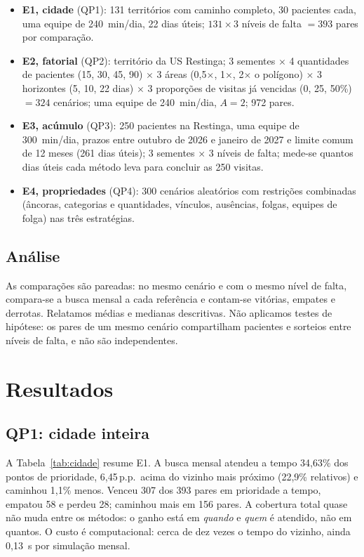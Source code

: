 \documentclass[conference,a4paper]{IEEEtran}
\newcommand{\pp}{\,p.p.}
\begin{document}
\begin{itemize}
  \item \textbf{E1, cidade} (QP1): 131 territórios com caminho completo, 30 pacientes cada, uma equipe de 240~min/dia, 22 dias úteis; $131 \times 3$ níveis de falta $= 393$ pares por comparação.
  \item \textbf{E2, fatorial} (QP2): território da US Restinga; 3 sementes $\times$ 4 quantidades de pacientes (15, 30, 45, 90) $\times$ 3 áreas (0,5$\times$, 1$\times$, 2$\times$ o polígono) $\times$ 3 horizontes (5, 10, 22 dias) $\times$ 3 proporções de visitas já vencidas (0, 25, 50\%) $= 324$ cenários; uma equipe de 240~min/dia, $A=2$; 972 pares.
  \item \textbf{E3, acúmulo} (QP3): 250 pacientes na Restinga, uma equipe de 300~min/dia, prazos entre outubro de 2026 e janeiro de 2027 e limite comum de 12 meses (261 dias úteis); 3 sementes $\times$ 3 níveis de falta; mede-se quantos dias úteis cada método leva para concluir as 250 visitas.
  \item \textbf{E4, propriedades} (QP4): 300 cenários aleatórios com restrições combinadas (âncoras, categorias e quantidades, vínculos, ausências, folgas, equipes de folga) nas três estratégias.
\end{itemize}

\subsection{Análise}

As comparações são pareadas: no mesmo cenário e com o mesmo nível de falta, compara-se a busca mensal a cada referência e contam-se vitórias, empates e derrotas. Relatamos médias e medianas descritivas. Não aplicamos testes de hipótese: os pares de um mesmo cenário compartilham pacientes e sorteios entre níveis de falta, e não são independentes.

\section{Resultados}\label{sec:resultados}

\subsection{QP1: cidade inteira}

A Tabela~\ref{tab:cidade} resume E1. A busca mensal atendeu a tempo 34,63\% dos pontos de prioridade, 6,45\pp\ acima do vizinho mais próximo (22,9\% relativos) e caminhou 1,1\% menos. Venceu 307 dos 393 pares em prioridade a tempo, empatou 58 e perdeu 28; caminhou mais em 156 pares. A cobertura total quase não muda entre os métodos: o ganho está em \emph{quando} e \emph{quem} é atendido, não em quantos. O custo é computacional: cerca de dez vezes o tempo do vizinho, ainda 0,13~s por simulação mensal.
\end{document}
